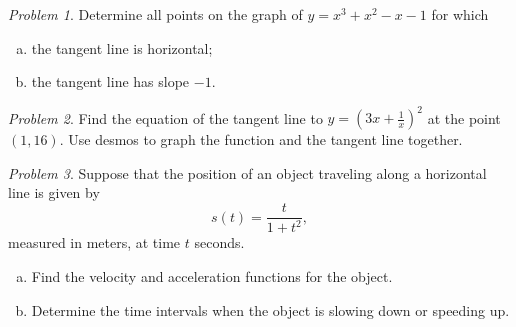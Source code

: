\documentclass[11pt,twoside]{amsart}
\theoremstyle{plain}
\theoremstyle{remark}
\newtheorem{prob}{Problem}
\theoremstyle{definition}
\theoremstyle{definition}
\begin{document}
\begin{prob}
Determine all points on the graph of $y=x^3+x^2-x-1$ for which
\begin{enumerate}[(a)]
\item the tangent line is horizontal;
\item the tangent line has slope $-1$.
\end{enumerate}
\end{prob}

\begin{prob}
Find the equation of the tangent line to $y=(3x+\frac{1}{x})^2$ at the point $(1,16)$. Use desmos to graph the function and the tangent line together.
\end{prob}

\begin{prob}
Suppose that the position of an object traveling along a horizontal line is given by
\[
 s(t) = \frac{t}{1+t^2},
\]
measured in meters, at time $t$ seconds.
\begin{enumerate}[(a)]
\item Find the velocity and acceleration functions for the object.
\item Determine the time intervals when the object is slowing down or speeding up.
\end{enumerate}
\end{prob}
\end{document}
